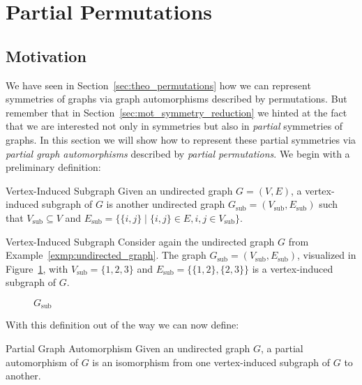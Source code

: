\section{Partial Permutations}
\label{sec:theo_partial_permutations}

\subsection{Motivation}

We have seen in Section~\ref{sec:theo_permutations} how we can represent
symmetries of graphs via graph automorphisms described by permutations. But
remember that in Section~\ref{sec:mot_symmetry_reduction} we hinted at the fact
that we are interested not only in symmetries but also in \textit{partial}
symmetries of graphs. In this section we will show how to represent these
partial symmetries via \textit{partial graph automorphisms} described by
\textit{partial permutations}. We begin with a preliminary definition:

\begin{defn}{Vertex-Induced Subgraph}
  Given an undirected graph $G = (V,E)$, a vertex-induced subgraph of $G$ is another
  undirected graph $G_{\mathrm{sub}} = (V_{\mathrm{sub}},E_{\mathrm{sub}})$ such
  that $V_{\mathrm{sub}} \subseteq V$ and $E_{\mathrm{sub}} = \{\{i,j\} \mid
  \{i, j\} \in E, i, j \in V_{\mathrm{sub}}\}$.
\end{defn}

\begin{exmp}{Vertex-Induced Subgraph}
  Consider again the undirected graph $G$ from
  Example~\ref{exmp:undirected_graph}.  The graph $G_{\mathrm{sub}} =
  (V_{\mathrm{sub}},E_{\mathrm{sub}})$, visualized in
  Figure~\ref{fig:vertex_induced_subgraph}, with $V_{\mathrm{sub}} = \{1,2,3\}$
  and $E_{\mathrm{sub}} = \{\{1,2\},\{2,3\}\}$ is a vertex-induced subgraph of
  $G$.
  \begin{figure}[H]
    \centering
    \caption{$G_{\mathrm{sub}}$}
    \label{fig:vertex_induced_subgraph}
  \end{figure}
\end{exmp}
%
With this definition out of the way we can now define:

\begin{defn}{Partial Graph Automorphism}
  Given an undirected graph $G$, a partial automorphism of $G$ is an
  isomorphism from one vertex-induced subgraph of $G$ to another.
\end{defn}

